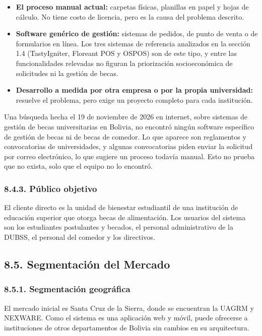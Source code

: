 \begin{itemize}
    \item \textbf{El proceso manual actual:} carpetas físicas, planillas en papel y hojas de cálculo. No tiene costo de licencia, pero es la causa del problema descrito.
    \item \textbf{Software genérico de gestión:} sistemas de pedidos, de punto de venta o de formularios en línea. Los tres sistemas de referencia analizados en la sección 1.4 (TastyIgniter, Floreant POS y OSPOS) son de este tipo, y entre las funcionalidades relevadas no figuran la priorización socioeconómica de solicitudes ni la gestión de becas.
    \item \textbf{Desarrollo a medida por otra empresa o por la propia universidad:} resuelve el problema, pero exige un proyecto completo para cada institución.
\end{itemize}

Una búsqueda hecha el 19 de noviembre de 2026 en internet, sobre sistemas de gestión de becas universitarias en Bolivia, no encontró ningún software específico de gestión de becas ni de becas de comedor. Lo que aparece son reglamentos y convocatorias de universidades, y algunas convocatorias piden enviar la solicitud por correo electrónico, lo que sugiere un proceso todavía manual. Esto no prueba que no exista, solo que el equipo no lo encontró.

\subsubsection{8.4.3. Público objetivo}

El cliente directo es la unidad de bienestar estudiantil de una institución de educación superior que otorga becas de alimentación. Los usuarios del sistema son los estudiantes postulantes y becados, el personal administrativo de la DUBSS, el personal del comedor y los directivos.

\subsection{8.5. Segmentación del Mercado}

\subsubsection{8.5.1. Segmentación geográfica}

El mercado inicial es Santa Cruz de la Sierra, donde se encuentran la UAGRM y NEXWARE. Como el sistema es una aplicación web y móvil, puede ofrecerse a instituciones de otros departamentos de Bolivia sin cambios en su arquitectura.

